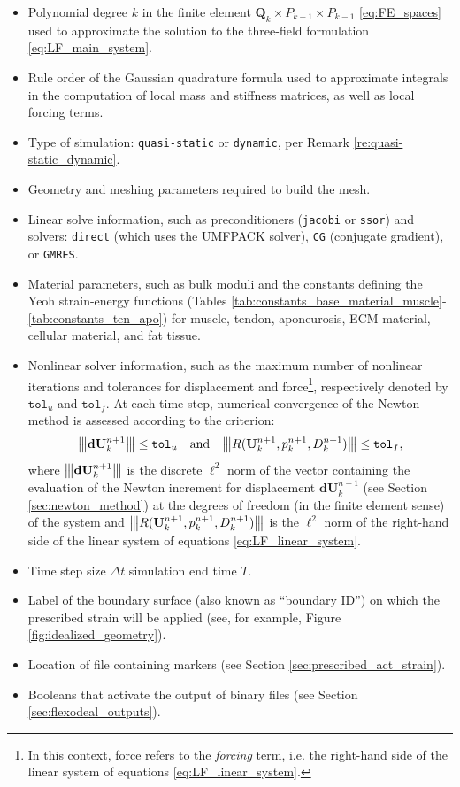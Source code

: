 \documentclass{sfuthesis}
\numberwithin{equation}{section}
\numberwithin{figure}{chapter}
\numberwithin{table}{chapter}
\theoremstyle{definition}
\def\*#1{{\mathbf{#1}}} %
\newcommand{\vertiii}[1]{{\left\vert\kern-0.25ex\left\vert\kern-0.25ex\left\vert #1 
    \right\vert\kern-0.25ex\right\vert\kern-0.25ex\right\vert}}
\begin{document}
\begin{itemize}
    \item Polynomial degree $k$ in the finite element $\*Q_{k} \times P_{k-1} \times P_{k-1}$ \eqref{eq:FE_spaces} used to approximate the solution to the three-field formulation \eqref{eq:LF_main_system}.
    \item Rule order of the Gaussian quadrature formula used to approximate integrals in the computation of local mass and stiffness matrices, as well as local forcing terms.
    \item Type of simulation: \texttt{quasi-static} or \texttt{dynamic}, per Remark \ref{re:quasi-static_dynamic}.
    \item Geometry and meshing parameters required to build the mesh.
    \item Linear solve information, such as preconditioners (\texttt{jacobi} or \texttt{ssor}) and solvers: \texttt{direct} (which uses the UMFPACK solver), \texttt{CG} (conjugate gradient), or \texttt{GMRES}.
    \item Material parameters, such as bulk moduli and the constants defining the Yeoh strain-energy functions (Tables \ref{tab:constants_base_material_muscle}-\ref{tab:constants_ten_apo}) for muscle, tendon, aponeurosis, ECM material, cellular material, and fat tissue.
    \item Nonlinear solver information, such as the maximum number of nonlinear iterations and tolerances for displacement and force\footnote{In this context, force refers to the \textit{forcing} term, i.e. the right-hand side of the linear system of equations \eqref{eq:LF_linear_system}.}, respectively denoted by $\mathtt{tol}_u$ and $\mathtt{tol}_f$. At each time step, numerical convergence of the Newton method is assessed according to the criterion:
    \[
        \vertiii{\*d \*U_k^{n+1}} \leq \mathtt{tol}_u \quad \text{and} \quad \vertiii{R(\*U_k^{n+1}, p_k^{n+1}, D_k^{n+1})} \leq \mathtt{tol}_f,
    \]
    where $\vertiii{\*d \*U_k^{n+1}}$ is the discrete $\ell^2$ norm of the vector containing the evaluation of the Newton increment for displacement $\*d \*U_k^{n+1}$ (see Section \ref{sec:newton_method}) at the degrees of freedom (in the finite element sense) of the system and $\vertiii{R(\*U_k^{n+1}, p_k^{n+1}, D_k^{n+1})}$ is the $\ell^2$ norm of the right-hand side of the linear system of equations \eqref{eq:LF_linear_system}.
    \item Time step size $\Delta t $ simulation end time $T$.
    \item Label of the boundary surface (also known as ``boundary ID'') on which the prescribed strain will be applied (see, for example, Figure \ref{fig:idealized_geometry}).
    \item Location of file containing markers (see Section \ref{sec:prescribed_act_strain}).
    \item Booleans that activate the output of binary files (see Section \ref{sec:flexodeal_outputs}).
\end{itemize}
\end{document}
